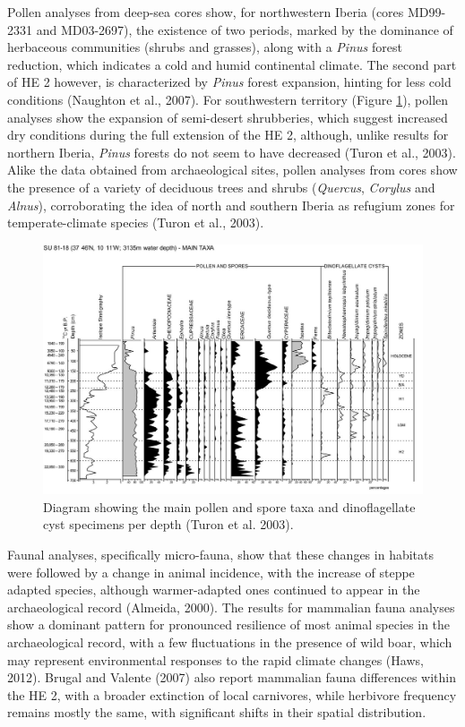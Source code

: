 \documentclass[12pt,twoside]{reedthesis}
\begin{document}
Pollen analyses from deep-sea cores show, for northwestern Iberia (cores MD99-2331 and MD03-2697), the existence of two periods, marked by the dominance of herbaceous communities (shrubs and grasses), along with a \emph{Pinus} forest reduction, which indicates a cold and humid continental climate. The second part of HE 2 however, is characterized by \emph{Pinus} forest expansion, hinting for less cold conditions (Naughton et al., 2007). For southwestern territory (Figure \ref{fig:su8118}), pollen analyses show the expansion of semi-desert shrubberies, which suggest increased dry conditions during the full extension of the HE 2, although, unlike results for northern Iberia, \emph{Pinus} forests do not seem to have decreased (Turon et al., 2003). Alike the data obtained from archaeological sites, pollen analyses from cores show the presence of a variety of deciduous trees and shrubs (\emph{Quercus}, \emph{Corylus} and \emph{Alnus}), corroborating the idea of north and southern Iberia as refugium zones for temperate-climate species (Turon et al., 2003).
\begin{figure}[H]

{\centering \includegraphics[width=0.8\linewidth]{figure/Turon2003_SU81-18} 

}

\caption{Diagram showing the main pollen and spore taxa and dinoflagellate cyst specimens per depth (Turon et al. 2003).}\label{fig:su8118}
\end{figure}
Faunal analyses, specifically micro-fauna, show that these changes in habitats were followed by a change in animal incidence, with the increase of steppe adapted species, although warmer-adapted ones continued to appear in the archaeological record (Almeida, 2000). The results for mammalian fauna analyses show a dominant pattern for pronounced resilience of most animal species in the archaeological record, with a few fluctuations in the presence of wild boar, which may represent environmental responses to the rapid climate changes (Haws, 2012). Brugal and Valente (2007) also report mammalian fauna differences within the HE 2, with a broader extinction of local carnivores, while herbivore frequency remains mostly the same, with significant shifts in their spatial distribution.
\end{document}
